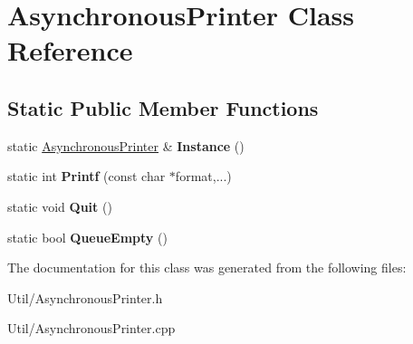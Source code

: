\hypertarget{class_asynchronous_printer}{
\section{\-Asynchronous\-Printer \-Class \-Reference}
\label{class_asynchronous_printer}
}
\subsection*{\-Static \-Public \-Member \-Functions}
\begin{DoxyCompactItemize}
\item 
\hypertarget{class_asynchronous_printer_ab1553ae0b41d933f38a8e8439f687b42}{
static \hyperlink{class_asynchronous_printer}{\-Asynchronous\-Printer} \& {\bfseries \-Instance} ()}
\label{class_asynchronous_printer_ab1553ae0b41d933f38a8e8439f687b42}

\item 
\hypertarget{class_asynchronous_printer_a0ef1c5904f24fd48fda1e724f4f0f68f}{
static int {\bfseries \-Printf} (const char $\ast$format,...)}
\label{class_asynchronous_printer_a0ef1c5904f24fd48fda1e724f4f0f68f}

\item 
\hypertarget{class_asynchronous_printer_af42d841d7d5c70f34e81c98a212478b6}{
static void {\bfseries \-Quit} ()}
\label{class_asynchronous_printer_af42d841d7d5c70f34e81c98a212478b6}

\item 
\hypertarget{class_asynchronous_printer_af56a3f2c43c68f55495fc7ffd1025c1e}{
static bool {\bfseries \-Queue\-Empty} ()}
\label{class_asynchronous_printer_af56a3f2c43c68f55495fc7ffd1025c1e}

\end{DoxyCompactItemize}


\-The documentation for this class was generated from the following files\-:\begin{DoxyCompactItemize}
\item 
\-Util/\-Asynchronous\-Printer.\-h\item 
\-Util/\-Asynchronous\-Printer.\-cpp\end{DoxyCompactItemize}

